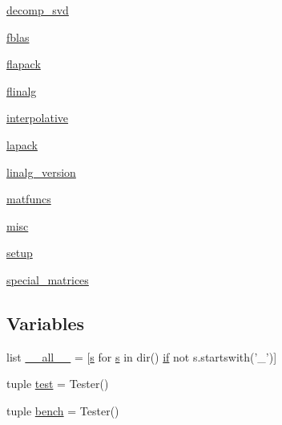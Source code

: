 \begin{DoxyCompactItemize}
 \hyperlink{namespacescipy_1_1linalg_1_1decomp__svd}{decomp\+\_\+svd}
\item 
 \hyperlink{namespacescipy_1_1linalg_1_1fblas}{fblas}
\item 
 \hyperlink{namespacescipy_1_1linalg_1_1flapack}{flapack}
\item 
 \hyperlink{namespacescipy_1_1linalg_1_1flinalg}{flinalg}
\item 
 \hyperlink{namespacescipy_1_1linalg_1_1interpolative}{interpolative}
\item 
 \hyperlink{namespacescipy_1_1linalg_1_1lapack}{lapack}
\item 
 \hyperlink{namespacescipy_1_1linalg_1_1linalg__version}{linalg\+\_\+version}
\item 
 \hyperlink{namespacescipy_1_1linalg_1_1matfuncs}{matfuncs}
\item 
 \hyperlink{namespacescipy_1_1linalg_1_1misc}{misc}
\item 
 \hyperlink{namespacescipy_1_1linalg_1_1setup}{setup}
\item 
 \hyperlink{namespacescipy_1_1linalg_1_1special__matrices}{special\+\_\+matrices}
\end{DoxyCompactItemize}
\subsection*{Variables}
\begin{DoxyCompactItemize}
\item 
list \hyperlink{namespacescipy_1_1linalg_a63158add5d39fe2377cbc06247a194b7}{\+\_\+\+\_\+all\+\_\+\+\_\+} = \mbox{[}\hyperlink{indexexpr_8h_ae024b0db549122b44c349ae28ec990dc}{s} for \hyperlink{indexexpr_8h_ae024b0db549122b44c349ae28ec990dc}{s} in dir() \hyperlink{minmax_8h_a30a0ee9fee303f01d9c5e6f669e0dfe9}{if} not s.\+startswith('\+\_\+')\mbox{]}
\item 
tuple \hyperlink{namespacescipy_1_1linalg_a2ae3d22ab02369253ff16df0bf6d00e2}{test} = Tester()
\item 
tuple \hyperlink{namespacescipy_1_1linalg_a092ee30669cf7e85b1818062aac0a437}{bench} = Tester()
\end{DoxyCompactItemize}


